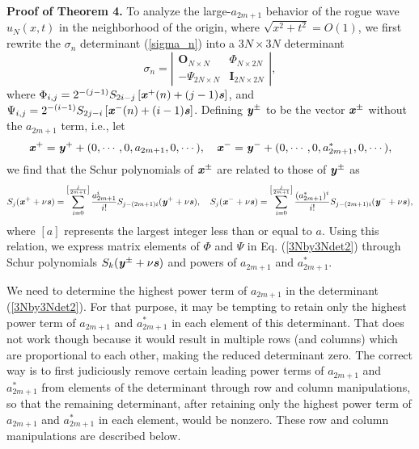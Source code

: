 \documentclass[amsmath,amssymb]{revtex4}
\def\[{\begin{equation}}
\def\]{\end{equation}}
\begin{document}
\textbf{Proof of Theorem 4.} \hspace{0.05cm}
To analyze the large-$a_{2m+1}$ behavior of the rogue wave $u_N(x,t)$ in the neighborhood of the origin, where $\sqrt{x^2+t^2}=O(1)$, we first rewrite the $\sigma_n$ determinant (\ref{sigma_n}) into a $3N\times 3N$ determinant \cite{OhtaJY2012}
\[ \label{3Nby3Ndet2}
\sigma_{n}=\left|\begin{array}{cc}
\textbf{O}_{N\times N} & \Phi_{N\times 2N} \\
-\Psi_{2N\times N} & \textbf{I}_{2N\times 2N} \end{array}\right|,
\]
where $\Phi_{i,j}=2^{-(j-1)} S_{2i-j}\left[\textbf{\emph{x}}^{+}(n) + (j-1) \textbf{\emph{s}}\right]$, and
$\Psi_{i,j}=2^{-(i-1)} S_{2j-i}\left[\textbf{\emph{x}}^{-}(n) + (i-1) \textbf{\emph{s}}\right]$.
Defining $\textbf{\emph{y}}^{\pm}$ to be the vector $\textbf{\emph{x}}^{\pm}$ without the $a_{2m+1}$ term, i.e., let
\[
\textbf{\emph{x}}^{+}=\textbf{\emph{y}}^{+}+(0, \cdots, 0, a_{2m+1}, 0, \cdots), \quad
\textbf{\emph{x}}^{-}=\textbf{\emph{y}}^{-}+(0, \cdots, 0, a_{2m+1}^*, 0, \cdots),
\]
we find that the Schur polynomials of $\textbf{\emph{x}}^{\pm}$ are related to those of $\textbf{\emph{y}}^{\pm}$ as
\begin{equation} \label{Sjrelation}
S_{j}(\textbf{\emph{x}}^{+}+\nu\textbf{\emph{s}}) = \sum_{i=0}^{\left[\frac{j}{2m+1}\right]} \frac{a_{2m+1}^i}{i!} S_{j-(2m+1)i}(\textbf{\emph{y}}^{+}+\nu\textbf{\emph{s}}), \quad
S_{j}(\textbf{\emph{x}}^{-}+\nu\textbf{\emph{s}}) = \sum_{i=0}^{\left[\frac{j}{2m+1}\right]} \frac{(a_{2m+1}^*)^i}{i!} S_{j-(2m+1)i}(\textbf{\emph{y}}^{-}+\nu\textbf{\emph{s}}),
\end{equation}
where $[a]$ represents the largest integer less than or equal to $a$. Using this relation, we express matrix elements of $\Phi$ and $\Psi$ in Eq. (\ref{3Nby3Ndet2}) through Schur polynomials $S_{k}(\textbf{\emph{y}}^{\pm}+\nu\textbf{\emph{s}})$ and powers of $a_{2m+1}$ and $a_{2m+1}^*$.

We need to determine the highest power term of $a_{2m+1}$ in the determinant (\ref{3Nby3Ndet2}). For that purpose, it may be tempting to retain only the highest power term of $a_{2m+1}$ and $a_{2m+1}^*$ in each element of this determinant. That does not work though because it would result in multiple rows (and columns) which are proportional to each other, making the reduced determinant zero. The correct way is to first judiciously remove certain leading power terms of $a_{2m+1}$ and $a_{2m+1}^*$ from elements of the determinant through row and column manipulations, so that the remaining determinant, after retaining only the highest power term of $a_{2m+1}$ and $a_{2m+1}^*$ in each element, would be nonzero. These row and column manipulations are described below.
\end{document}
